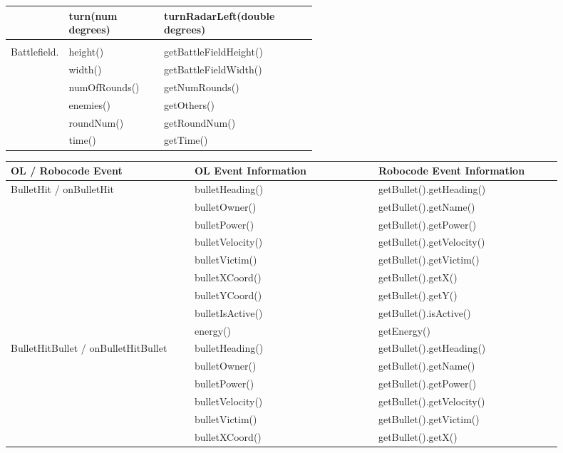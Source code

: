 \begin{center}
\begin{tabular}{ | l| l | p{0.5\linewidth} | }
     & turn(num degrees) & turnRadarLeft(double degrees) \\ \hline
     & &  \\ \hline
    Battlefield. & height() & getBattleFieldHeight() \\ \hline
     & width() & getBattleFieldWidth() \\ \hline
     & numOfRounds() & getNumRounds() \\ \hline
     & enemies() & getOthers() \\ \hline
     & roundNum() & getRoundNum() \\ \hline
     & time() & getTime()  \\
    \hline
    \end{tabular}
\end{center}

\begin{center}
	\begin{tabular}{ | p{0.3\linewidth} | p{0.3\linewidth} | p{0.3\linewidth} |}
		\hline
		OL / Robocode Event& OL Event Information & Robocode Event Information \\ \hline
		BulletHit / onBulletHit& bulletHeading() & getBullet().getHeading() \\ \hline
		& bulletOwner() & getBullet().getName() \\ \hline
		& bulletPower() & getBullet().getPower() \\ \hline
		& bulletVelocity() & getBullet().getVelocity() \\ \hline
		& bulletVictim() & getBullet().getVictim() \\ \hline
		& bulletXCoord() & getBullet().getX() \\ \hline
		& bulletYCoord() & getBullet().getY() \\ \hline
		& bulletIsActive() & getBullet().isActive() \\ \hline
		& energy() & getEnergy() \\ \hline
		BulletHitBullet / onBulletHitBullet& bulletHeading() & getBullet().getHeading() \\ \hline
		& bulletOwner() & getBullet().getName() \\ \hline
		& bulletPower() & getBullet().getPower() \\ \hline
		& bulletVelocity() & getBullet().getVelocity() \\ \hline
		& bulletVictim() & getBullet().getVictim() \\ \hline
		& bulletXCoord() & getBullet().getX() \\ \hline

\end{tabular}
\end{center}
